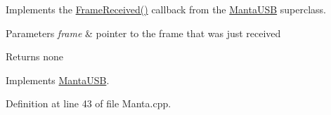 \-Implements the \hyperlink{classManta_ae2de440aa98c29ddc39c5870d6936112}{\-Frame\-Received()} callback from the \hyperlink{classMantaUSB}{\-Manta\-U\-S\-B} superclass. 


\begin{DoxyParams}{\-Parameters}
{\em frame} & pointer to the frame that was just received \\
\hline
\end{DoxyParams}
\begin{DoxyReturn}{\-Returns}
none 
\end{DoxyReturn}


\-Implements \hyperlink{classMantaUSB_abcf3545bb86f2175148bd06574b81632}{\-Manta\-U\-S\-B}.



\-Definition at line 43 of file \-Manta.\-cpp.


